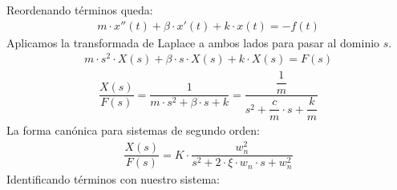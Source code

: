 \documentclass{article}
\begin{document}
Reordenando términos queda:
\begin{align*}
    m \cdot x''(t)
    + \beta \cdot x'(t)
    + k \cdot x(t) 
    = - f(t)
\end{align*}
Aplicamos la transformada de Laplace a ambos lados para pasar al dominio \(s\). 
\begin{align*}
    m \cdot s^2 \cdot X(s)
    + \beta \cdot s \cdot X(s)
    + k \cdot X(s)
    = 
    F(s)
\end{align*}
\begin{align*}
    \dfrac{X(s)}{F(s)}
    =
    \dfrac{1}{m \cdot s^2 + \beta \cdot s + k}
    =
    \dfrac{\dfrac{1}{m}}{s^2 + \dfrac{c}{m} \cdot s + \dfrac{k}{m}}
\end{align*}
La forma canónica para sistemas de segundo orden:
\begin{align*}
    \dfrac{X(s)}{F(s)}
    =
    K \cdot \dfrac{w_n^2}{s^2 + 2 \cdot \xi \cdot w_n \cdot s + w_n^2}
\end{align*}
Identificando términos con nuestro sistema:
\end{document}
